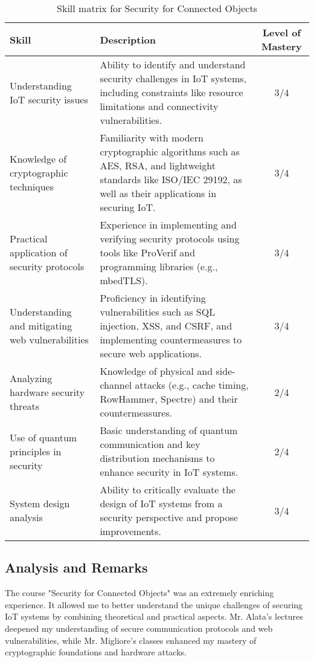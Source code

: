 \begin{table}[H]
    \centering
    \renewcommand{\arraystretch}{1.5} %
    \begin{tabular}{|>{\raggedright}p{3.5cm}|p{8cm}|c|}
    \hline
    \rowcolor[gray]{0.8}
    \textbf{Skill} & \textbf{Description} & \textbf{Level of Mastery} \\
    \hline
    Understanding IoT security issues & Ability to identify and understand security challenges in IoT systems, including constraints like resource limitations and connectivity vulnerabilities. & 3/4 \\
    \hline
    Knowledge of cryptographic techniques & Familiarity with modern cryptographic algorithms such as AES, RSA, and lightweight standards like ISO/IEC 29192, as well as their applications in securing IoT. & 3/4 \\
    \hline
    Practical application of security protocols & Experience in implementing and verifying security protocols using tools like ProVerif and programming libraries (e.g., mbedTLS). & 3/4 \\
    \hline
    Understanding and mitigating web vulnerabilities & Proficiency in identifying vulnerabilities such as SQL injection, XSS, and CSRF, and implementing countermeasures to secure web applications. & 3/4 \\
    \hline
    Analyzing hardware security threats & Knowledge of physical and side-channel attacks (e.g., cache timing, RowHammer, Spectre) and their countermeasures. & 2/4 \\
    \hline
    Use of quantum principles in security & Basic understanding of quantum communication and key distribution mechanisms to enhance security in IoT systems. & 2/4 \\
    \hline
    System design analysis & Ability to critically evaluate the design of IoT systems from a security perspective and propose improvements. & 3/4 \\
    \hline
    \end{tabular}
    \caption{Skill matrix for Security for Connected Objects}
    \label{table:skills-security-iot}
\end{table}

\subsection{Analysis and Remarks}
\indent \indent The course "Security for Connected Objects" was an extremely enriching experience. It allowed me to better understand the unique challenges of securing IoT systems by combining theoretical and practical aspects. Mr. Alata's lectures deepened my understanding of secure communication protocols and web vulnerabilities, while Mr. Migliore's classes enhanced my mastery of cryptographic foundations and hardware attacks.
\vspace{0.25cm}

